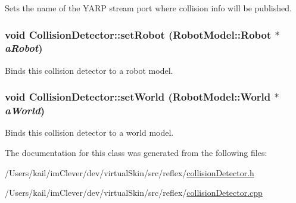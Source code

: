 Sets the name of the YARP stream port where collision info will be published. \hypertarget{class_collision_detector_a2c768facee0187d691dcc268b91d9652}{
\subsubsection[{setRobot}]{\setlength{\rightskip}{0pt plus 5cm}void CollisionDetector::setRobot ({\bf RobotModel::Robot} $\ast$ {\em aRobot})}}
\label{class_collision_detector_a2c768facee0187d691dcc268b91d9652}


Binds this collision detector to a robot model. \hypertarget{class_collision_detector_a7490b9d8f95f73b55b3add14ea58a737}{
\subsubsection[{setWorld}]{\setlength{\rightskip}{0pt plus 5cm}void CollisionDetector::setWorld ({\bf RobotModel::World} $\ast$ {\em aWorld})}}
\label{class_collision_detector_a7490b9d8f95f73b55b3add14ea58a737}


Binds this collision detector to a world model. 

The documentation for this class was generated from the following files:\begin{DoxyCompactItemize}
\item 
/Users/kail/imClever/dev/virtualSkin/src/reflex/\hyperlink{collision_detector_8h}{collisionDetector.h}\item 
/Users/kail/imClever/dev/virtualSkin/src/reflex/\hyperlink{collision_detector_8cpp}{collisionDetector.cpp}\end{DoxyCompactItemize}

